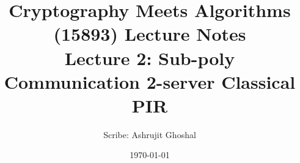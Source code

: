 \documentclass[11pt]{article}
\title{{\Large Cryptography Meets Algorithms (15893) Lecture Notes}\\[5pt]
{\bf Lecture 2: Sub-poly Communication 2-server Classical PIR}}
\author{Scribe:  Ashrujit Ghoshal}
\date{\today}
\begin{document}
\maketitle


{

}



\end{document}
